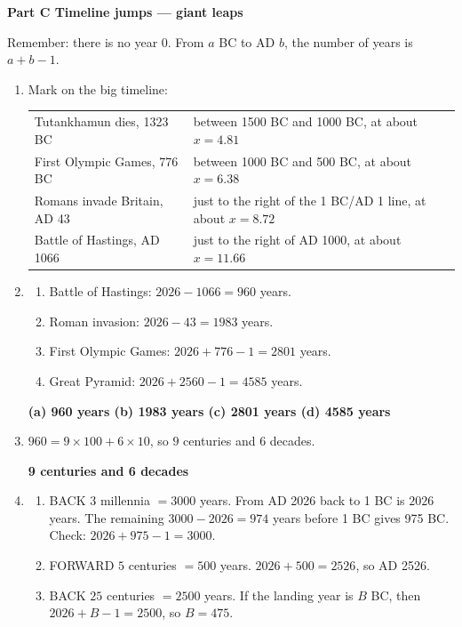 \documentclass[11pt,a4paper]{article}
\newcommand{\banner}[1]{{\color{ttdark}\large\bfseries #1}\par\vspace{-4pt}{\color{ttdark}\rule{\linewidth}{1pt}}\par\vspace{2pt}}
\newcommand{\ans}[1]{\textcolor{ttaccent}{\bfseries #1}}
\begin{document}
\banner{Part C \quad Timeline jumps --- giant leaps}

Remember: there is no year $0$. From $a$ BC to AD $b$, the number of years is
$a+b-1$.

\begin{enumerate}[label=\textbf{\arabic*.}, leftmargin=*, itemsep=6pt]
\item Mark on the big timeline:
\begin{center}
\begin{tabular}{@{}ll@{}}
Tutankhamun dies, 1323 BC & between 1500 BC and 1000 BC, at about $x=4.81$\\[2pt]
First Olympic Games, 776 BC & between 1000 BC and 500 BC, at about $x=6.38$\\[2pt]
Romans invade Britain, AD 43 & just to the right of the 1 BC/AD 1 line, at about $x=8.72$\\[2pt]
Battle of Hastings, AD 1066 & just to the right of AD 1000, at about $x=11.66$
\end{tabular}
\end{center}

\item
\begin{enumerate}[label=(\alph*), leftmargin=1.4em, itemsep=1pt]
\item Battle of Hastings: $2026-1066=960$ years.
\item Roman invasion: $2026-43=1983$ years.
\item First Olympic Games: $2026+776-1=2801$ years.
\item Great Pyramid: $2026+2560-1=4585$ years.
\end{enumerate}

\ans{(a) 960 years \quad (b) 1983 years \quad (c) 2801 years \quad (d) 4585 years}

\item $960=9\times100+6\times10$, so $9$ centuries and $6$ decades.

\ans{9 centuries and 6 decades}

\item
\begin{enumerate}[label=(\alph*), leftmargin=1.4em, itemsep=2pt]
\item BACK $3$ millennia $=3000$ years. From AD 2026 back to 1 BC is $2026$ years. The remaining $3000-2026=974$ years before 1 BC gives 975 BC. Check: $2026+975-1=3000$.
\item FORWARD $5$ centuries $=500$ years. $2026+500=2526$, so AD 2526.
\item BACK $25$ centuries $=2500$ years. If the landing year is $B$ BC, then $2026+B-1=2500$, so $B=475$.
\end{enumerate}


\end{enumerate}
\end{document}
